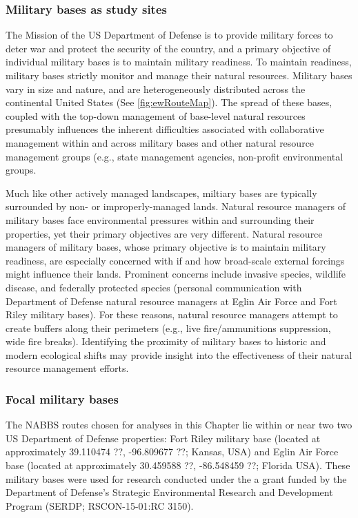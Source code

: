 \documentclass[12pt,twoside]{reedthesis}
\begin{document}
\subsubsection{Military bases as study
sites}\label{military-bases-as-study-sites}

The Mission of the US Department of Defense is to provide military
forces to deter war and protect the security of the country, and a
primary objective of individual military bases is to maintain military
readiness. To maintain readiness, military bases strictly monitor and
manage their natural resources. Military bases vary in size and nature,
and are heterogeneously distributed across the continental United States
(See \ref{fig:ewRouteMap}). The spread of these bases, coupled with the
top-down management of base-level natural resources presumably
influences the inherent difficulties associated with collaborative
management within and across military bases and other natural resource
management groups (e.g., state management agencies, non-profit
environmental groups.

Much like other actively managed landscapes, miltiary bases are
typically surrounded by non- or improperly-managed lands. Natural
resource managers of military bases face environmental pressures within
and surrounding their properties, yet their primary objectives are very
different. Natural resource managers of military bases, whose primary
objective is to maintain military readiness, are especially concerned
with if and how broad-scale external forcings might influence their
lands. Prominent concerns include invasive species, wildlife disease,
and federally protected species (personal communication with Department
of Defense natural resource managers at Eglin Air Force and Fort Riley
military bases). For these reasons, natural resource managers attempt to
create buffers along their perimeters (e.g., live fire/ammunitions
suppression, wide fire breaks). Identifying the proximity of military
bases to historic and modern ecological shifts may provide insight into
the effectiveness of their natural resource management efforts.

\subsubsection{Focal military bases}\label{focal-military-bases}

The NABBS routes chosen for analyses in this Chapter lie within or near
two two US Department of Defense properties: Fort Riley military base
(located at approximately 39.110474 ??, -96.809677 ??; Kansas, USA) and
Eglin Air Force base (located at approximately 30.459588 ??, -86.548459
??; Florida USA). These military bases were used for research conducted
under the a grant funded by the Department of Defense's Strategic
Environmental Research and Development Program (SERDP; RSCON-15-01:RC
3150).
\end{document}
